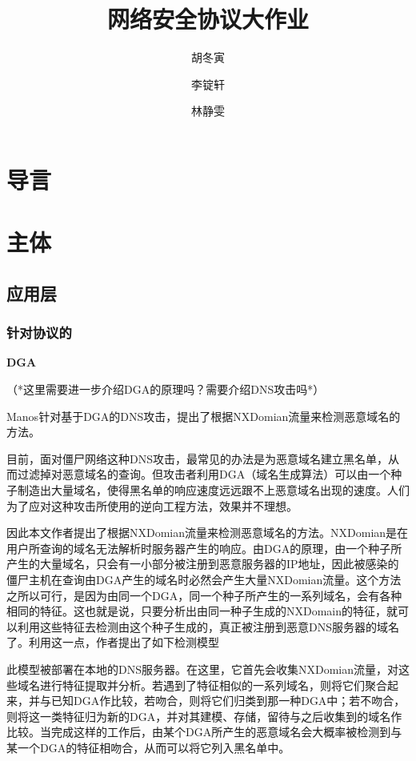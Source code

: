 \documentclass[12pt]{article} %
\title{网络安全协议大作业}
\author{胡冬寅 \and 李锭轩 \and 林静雯}
\date{} %
\begin{document}
\maketitle

\section{导言}

\section{主体}
\label{main}

\subsection{应用层}
\label{app}

\subsubsection{针对协议的}
\label{protocol}

\textbf{DGA}

（*这里需要进一步介绍DGA的原理吗？需要介绍DNS攻击吗*）

Manos针对基于DGA的DNS攻击，提出了根据NXDomian流量来检测恶意域名的方法。

目前，面对僵尸网络这种DNS攻击，最常见的办法是为恶意域名建立黑名单，从而过滤掉对恶意域名的查询。但攻击者利用DGA（域名生成算法）可以由一个种子制造出大量域名，使得黑名单的响应速度远远跟不上恶意域名出现的速度。人们为了应对这种攻击所使用的逆向工程方法，效果并不理想。

因此本文作者提出了根据NXDomian流量来检测恶意域名的方法。NXDomian是在用户所查询的域名无法解析时服务器产生的响应。由DGA的原理，由一个种子所产生的大量域名，只会有一小部分被注册到恶意服务器的IP地址，因此被感染的僵尸主机在查询由DGA产生的域名时必然会产生大量NXDomian流量。这个方法之所以可行，是因为由同一个DGA，同一个种子所产生的一系列域名，会有各种相同的特征。这也就是说，只要分析出由同一种子生成的NXDomain的特征，就可以利用这些特征去检测由这个种子生成的，真正被注册到恶意DNS服务器的域名了。利用这一点，作者提出了如下检测模型


此模型被部署在本地的DNS服务器。在这里，它首先会收集NXDomian流量，对这些域名进行特征提取并分析。若遇到了特征相似的一系列域名，则将它们聚合起来，并与已知DGA作比较，若吻合，则将它们归类到那一种DGA中；若不吻合，则将这一类特征归为新的DGA，并对其建模、存储，留待与之后收集到的域名作比较。当完成这样的工作后，由某个DGA所产生的恶意域名会大概率被检测到与某一个DGA的特征相吻合，从而可以将它列入黑名单中。
\end{document}
